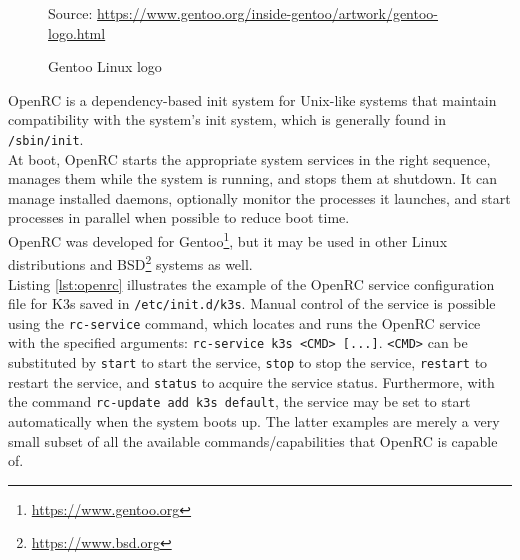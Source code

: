 \begin{figure} %
  \centering
  \def\stackalignment{r} %
  {\scriptsize \parbox[t]{\linewidth}{ Source: \url{https://www.gentoo.org/inside-gentoo/artwork/gentoo-logo.html}} }
  \caption{Gentoo Linux logo}
\end{figure}

OpenRC is a dependency-based init system for Unix-like systems that maintain compatibility
with the system's init system, which is generally found in \texttt{/sbin/init}. \\ %
At boot, OpenRC starts the appropriate system services in the right sequence,
manages them while the system is running, and stops them at shutdown. It can
manage installed daemons, optionally monitor the processes it launches, and
start processes in parallel when possible to reduce boot time. \\ %
OpenRC was developed for Gentoo\footnote{\url{https://www.gentoo.org}}, but it may
be used in other Linux distributions and BSD\footnote{\url{https://www.bsd.org}}
systems as well\cite{openrc}. \\ %
Listing \ref{lst:openrc} illustrates the example of the OpenRC service
configuration file for K3s saved in \texttt{/etc/init.d/k3s}. Manual control of the
service is possible using the \texttt{rc-service} command, which locates and runs
the OpenRC service with the specified arguments: \texttt{rc-service k3s <CMD> [...]}.
\texttt{<CMD>} can be substituted by \texttt{start} to start the service, \texttt{stop}
to stop the service, \texttt{restart} to restart the service, and \texttt{status}
to acquire the service status. Furthermore, with the command \texttt{rc-update
add k3s default}, the service may be set to start automatically when the system
boots up. The latter examples are merely a very small subset of all the available
commands/capabilities that OpenRC is capable of.


